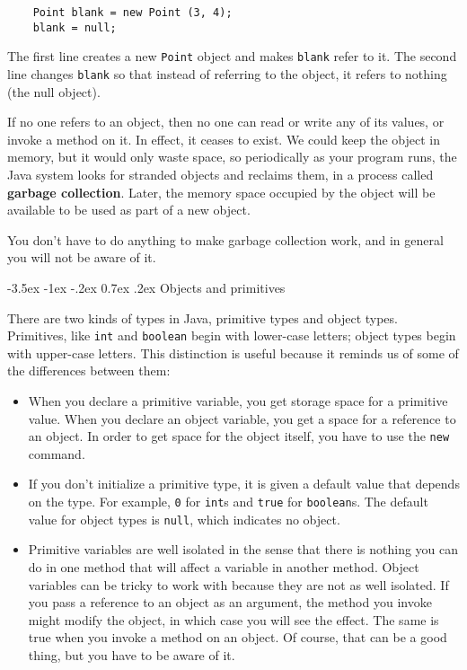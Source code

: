 \documentclass{book}
\makeatletter
\renewcommand{\section}{\@startsection 
    {section} {1} {0mm}%
    {-3.5ex \@plus -1ex \@minus -.2ex}%
    {0.7ex \@plus.2ex}%
    {\normalfont\Large\bfseries}}
\newcommand{\beforefig}{\vspace{1.3\parskip}}
\newcommand{\afterfig}{\vspace{-0.2\parskip}}
\newcommand{\myfig}[1]{
    \beforefig
    \centerline{\epsfig{#1,scale=0.8}}
    \afterfig
}
\makeatother
\begin{document}
\begin{verbatim}
    Point blank = new Point (3, 4);
    blank = null;
\end{verbatim}
%
The first line creates a new {\tt Point} object and makes
{\tt blank} refer to it.  The second line changes {\tt blank}
so that instead of referring to the object, it refers to
nothing (the null object).


\myfig{figure=figs/reference3.eps}


If no one refers to an object, then no one can read or write any of
its values, or invoke a method on it.  In effect, it ceases to exist.
We could keep the object in memory, but it would only waste space, so
periodically as your program runs, the Java system looks for stranded
objects and reclaims them, in a process called {\bf garbage
collection}.  Later, the memory space occupied by the object will
be available to be used as part of a new object.

You don't have to do anything to make garbage collection work,
and in general you will not be aware of it.

\section {Objects and primitives}

There are two kinds of types in Java, primitive types and
object types.  Primitives, like {\tt int} and {\tt boolean}
begin with lower-case letters; object types begin with
upper-case letters.  This distinction is useful because it
reminds us of some of the differences between them:

\begin{itemize}

\item When you declare a primitive variable, you get storage
space for a primitive value.  When you declare an object variable, you
get a space for a reference to an object.  In order to get space for
the object itself, you have to use the {\tt new} command.

\item If you don't initialize a primitive type, it is given
a default value that depends on the type.  For example,
{\tt 0} for {\tt int}s and {\tt true} for {\tt boolean}s.
The default value for object types is {\tt null}, which indicates
no object.

\item Primitive variables are well isolated in the sense that there is
nothing you can do in one method that will affect a variable in
another method.  Object variables can be tricky to work with because
they are not as well isolated.  If you pass a reference to an object
as an argument, the method you invoke might modify the object, in which
case you will see the effect.  The same is true when you invoke a
method on an object.  Of course, that can be a good thing, but you
have to be aware of it.

\end{itemize}
\end{document}
